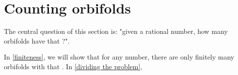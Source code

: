 \chapter{Counting orbifolds} \label{counting occurrences}

The central question of this section is: "given a rational number, how many orbifolds 
have that \Eoc ?". 

In \ref{finiteness}, we will show that for any number, there are only finitely many 
orbifolds with that \Eoc. 
In \ref{dividing the problem}, 


